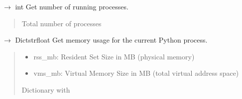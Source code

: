 \documentclass[letterpaper,10pt,english]{sphinxmanual}
\begin{document}

\begin{fulllineitems}
\label{\detokenize{core.execution.hardware_collector:core.execution.hardware_collector.get_process_count}}
\pysigstartsignatures
\pysiglinewithargsret
{}
{}
{{ $\rightarrow$ int}}
\pysigstopsignatures
\sphinxAtStartPar
Get number of running processes.
\begin{quote}\begin{description}
\sphinxAtStartPar
Total number of processes

\end{description}\end{quote}

\end{fulllineitems}


\begin{fulllineitems}
\label{\detokenize{core.execution.hardware_collector:core.execution.hardware_collector.get_process_memory}}
\pysigstartsignatures
\pysiglinewithargsret
{}
{}
{{ $\rightarrow$ Dict\DUrole{p}{{[}}strfloat\DUrole{p}{{]}}}}
\pysigstopsignatures
\sphinxAtStartPar
Get memory usage for the current Python process.
\begin{quote}\begin{description}
\sphinxAtStartPar
\begin{itemize}
\item {} 
\sphinxAtStartPar
rss\_mb: Resident Set Size in MB (physical memory)

\item {} 
\sphinxAtStartPar
vms\_mb: Virtual Memory Size in MB (total virtual address space)

\end{itemize}


\sphinxAtStartPar
Dictionary with

\end{description}\end{quote}

\end{fulllineitems}
\end{document}
